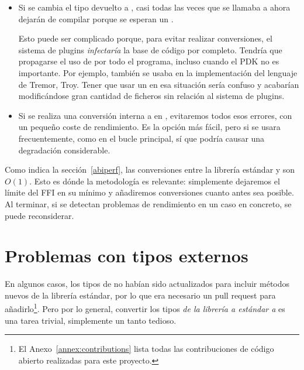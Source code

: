 \begin{itemize}
    \item Si se cambia el tipo devuelto a , casi todas las veces
        que se llamaba a  ahora dejarán de compilar porque se
        esperan un .

        Esto puede ser complicado porque, para evitar realizar conversiones, el
        sistema de plugins \emph{infectaría} la base de código por completo.
        Tendría que propagarse el uso de  por todo el programa,
        incluso cuando el PDK no es importante. Por ejemplo, 
        también se usaba en la implementación del lenguaje de Tremor, Troy.
        Tener que usar un  en esa situación sería confuso y
        acabarían modificándose gran cantidad de ficheros sin relación al
        sistema de plugins.

    \item Si se realiza una conversión interna a  en
        , evitaremos todos esos errores, con un pequeño coste de
        rendimiento. Es la opción más fácil, pero si  se
        usara frecuentemente, como en el bucle principal, sí que podría causar
        una degradación considerable.

\end{itemize}

Como indica la sección~\ref{abiperf}, las conversiones entre la librería
estándar y \abistable son $O(1)$. Esto es dónde la metodología \work es
relevante: simplemente dejaremos el límite del FFI en su mínimo y añadiremos
conversiones cuanto antes sea posible. Al terminar, si se detectan problemas de
rendimiento en un caso en concreto, se puede reconsiderar.

\section{Problemas con tipos externos}\label{sec:abi_ext}

En algunos casos, los tipos de \abistable no habían sido actualizados para
incluir métodos nuevos de la librería estándar, por lo que era necesario un pull
request para añadirlo\footnote{El Anexo~\ref{annex:contributions} lista todas
las contribuciones de código abierto realizadas para este proyecto.}. Pero por
lo general, convertir los tipos \emph{de la librería a estándar a \abistable} es
una tarea trivial, simplemente un tanto tedioso.

